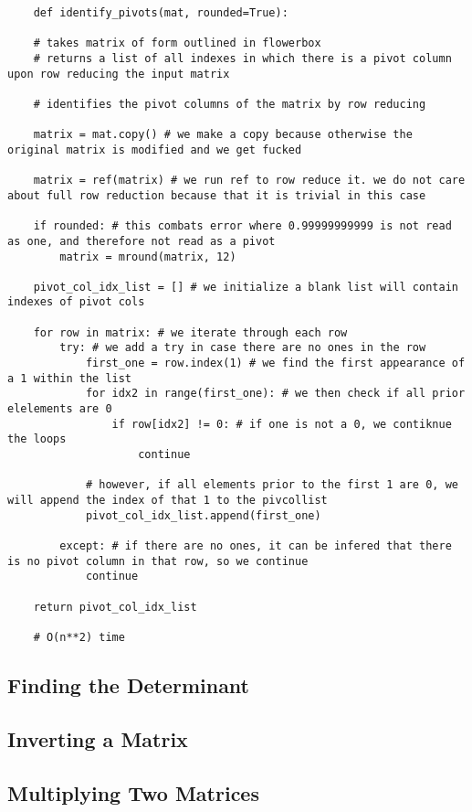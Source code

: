 \documentclass[12pt, a4paper]{article}
\begin{document}
\begin{lstlisting}
    def identify_pivots(mat, rounded=True):

    # takes matrix of form outlined in flowerbox
    # returns a list of all indexes in which there is a pivot column upon row reducing the input matrix

    # identifies the pivot columns of the matrix by row reducing

    matrix = mat.copy() # we make a copy because otherwise the original matrix is modified and we get fucked

    matrix = ref(matrix) # we run ref to row reduce it. we do not care about full row reduction because that it is trivial in this case
    
    if rounded: # this combats error where 0.99999999999 is not read as one, and therefore not read as a pivot
        matrix = mround(matrix, 12)

    pivot_col_idx_list = [] # we initialize a blank list will contain indexes of pivot cols

    for row in matrix: # we iterate through each row
        try: # we add a try in case there are no ones in the row
            first_one = row.index(1) # we find the first appearance of a 1 within the list
            for idx2 in range(first_one): # we then check if all prior elelements are 0
                if row[idx2] != 0: # if one is not a 0, we contiknue the loops
                    continue

            # however, if all elements prior to the first 1 are 0, we will append the index of that 1 to the pivcollist
            pivot_col_idx_list.append(first_one)

        except: # if there are no ones, it can be infered that there is no pivot column in that row, so we continue
            continue 

    return pivot_col_idx_list    

    # O(n**2) time
\end{lstlisting}


\subsection{Finding the Determinant}

\subsection{Inverting a Matrix}

\subsection{Multiplying Two Matrices}
\end{document}
